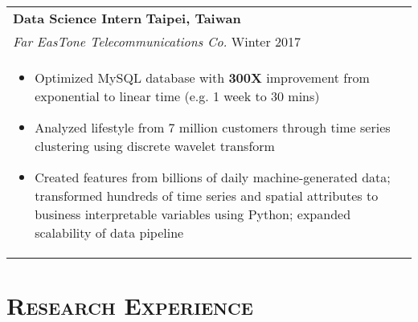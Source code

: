 \documentclass[letterpaper,11pt]{article} %
\begin{document}
{\begin{tabular}{p{18.5cm}}
{\bf{Data Science Intern}} \hfill \bf{Taipei, Taiwan}\\
{\it Far EasTone Telecommunications Co.} \hfill  Winter 2017\\%
\begin{itemize}
\vspace{-3mm}
\item Optimized MySQL database with {\bf300X} improvement from exponential to linear time (e.g. 1 week to 30 mins) 
\item Analyzed lifestyle from 7 million customers through time series clustering using discrete wavelet transform
\item Created features from billions of daily machine-generated data; transformed hundreds of time series and spatial attributes to business interpretable variables using Python; expanded scalability of data pipeline \vspace*{-\baselineskip}
\end{itemize} 
\vspace{.1mm}
\end{tabular}


\section{\Large\bf\textsc{Research Experience}}
\begin{tabular}{p{18.5cm}}



\end{tabular}}
\end{document}
